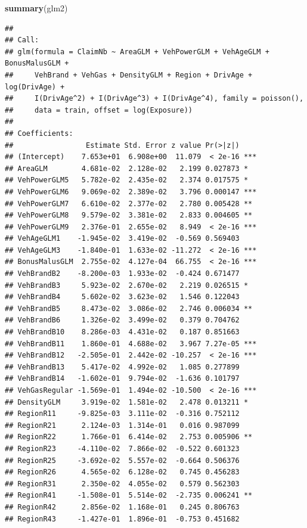 \documentclass[
]{article}
\newenvironment{Shaded}{\begin{snugshade}}{\end{snugshade}}
\newcommand{\FunctionTok}[1]{\textcolor[rgb]{0.13,0.29,0.53}{\textbf{#1}}}
\newcommand{\NormalTok}[1]{#1}
\begin{document}
\begin{Shaded}
\begin{Highlighting}[]
\FunctionTok{summary}\NormalTok{(glm2)}
\end{Highlighting}
\end{Shaded}

\begin{verbatim}
## 
## Call:
## glm(formula = ClaimNb ~ AreaGLM + VehPowerGLM + VehAgeGLM + BonusMalusGLM + 
##     VehBrand + VehGas + DensityGLM + Region + DrivAge + log(DrivAge) + 
##     I(DrivAge^2) + I(DrivAge^3) + I(DrivAge^4), family = poisson(), 
##     data = train, offset = log(Exposure))
## 
## Coefficients:
##                 Estimate Std. Error z value Pr(>|z|)    
## (Intercept)    7.653e+01  6.908e+00  11.079  < 2e-16 ***
## AreaGLM        4.681e-02  2.128e-02   2.199 0.027873 *  
## VehPowerGLM5   5.782e-02  2.435e-02   2.374 0.017575 *  
## VehPowerGLM6   9.069e-02  2.389e-02   3.796 0.000147 ***
## VehPowerGLM7   6.610e-02  2.377e-02   2.780 0.005428 ** 
## VehPowerGLM8   9.579e-02  3.381e-02   2.833 0.004605 ** 
## VehPowerGLM9   2.376e-01  2.655e-02   8.949  < 2e-16 ***
## VehAgeGLM1    -1.945e-02  3.419e-02  -0.569 0.569403    
## VehAgeGLM3    -1.840e-01  1.633e-02 -11.272  < 2e-16 ***
## BonusMalusGLM  2.755e-02  4.127e-04  66.755  < 2e-16 ***
## VehBrandB2    -8.200e-03  1.933e-02  -0.424 0.671477    
## VehBrandB3     5.923e-02  2.670e-02   2.219 0.026515 *  
## VehBrandB4     5.602e-02  3.623e-02   1.546 0.122043    
## VehBrandB5     8.473e-02  3.086e-02   2.746 0.006034 ** 
## VehBrandB6     1.326e-02  3.499e-02   0.379 0.704762    
## VehBrandB10    8.286e-03  4.431e-02   0.187 0.851663    
## VehBrandB11    1.860e-01  4.688e-02   3.967 7.27e-05 ***
## VehBrandB12   -2.505e-01  2.442e-02 -10.257  < 2e-16 ***
## VehBrandB13    5.417e-02  4.992e-02   1.085 0.277899    
## VehBrandB14   -1.602e-01  9.794e-02  -1.636 0.101797    
## VehGasRegular -1.569e-01  1.494e-02 -10.500  < 2e-16 ***
## DensityGLM     3.919e-02  1.581e-02   2.478 0.013211 *  
## RegionR11     -9.825e-03  3.111e-02  -0.316 0.752112    
## RegionR21      2.124e-03  1.314e-01   0.016 0.987099    
## RegionR22      1.766e-01  6.414e-02   2.753 0.005906 ** 
## RegionR23     -4.110e-02  7.866e-02  -0.522 0.601323    
## RegionR25     -3.692e-02  5.557e-02  -0.664 0.506376    
## RegionR26      4.565e-02  6.128e-02   0.745 0.456283    
## RegionR31      2.350e-02  4.055e-02   0.579 0.562303    
## RegionR41     -1.508e-01  5.514e-02  -2.735 0.006241 ** 
## RegionR42      2.856e-02  1.168e-01   0.245 0.806763    
## RegionR43     -1.427e-01  1.896e-01  -0.753 0.451682    

\end{verbatim}
\end{document}
